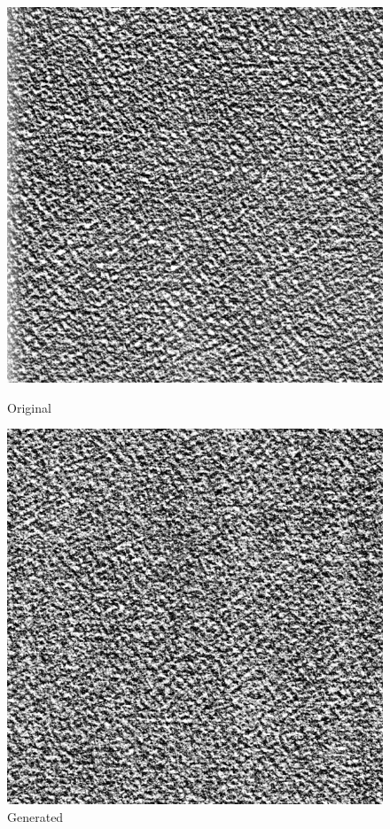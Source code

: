 \documentclass{article}
\begin{document}
\pagebreak
    \begin{figure}[!htb]
    \begin{center}
      \includegraphics[scale=.3]{5/report/random/7.png}
      \caption{Original}
    \end{center}
    \endminipage \hfill
    \begin{center}
      \includegraphics[scale=.3]{5/report/random/7_c.png}
      \caption{Generated}
    \end{center}
    \endminipage
    \end{figure}
    
\end{document}
